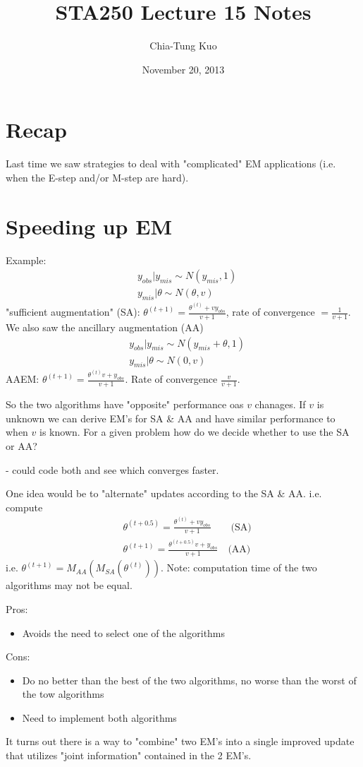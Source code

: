 \documentclass[11pt,letterpaper]{article}
\title{STA250 Lecture 15 Notes}
\author{Chia-Tung Kuo}
\date{November 20, 2013}
\begin{document}
\maketitle

\section*{Recap}
Last time we saw strategies to deal with "complicated" EM applications (i.e. when the E-step and/or M-step are hard).

\section*{Speeding up EM}
Example: 
\begin{align*}
&y_{obs} | y_{mis} \sim N(y_{mis}, 1)\\
& y_{mis}|\theta \sim N(\theta, v)
\end{align*}
"sufficient augmentation" (SA): $\theta^{(t+1)} = \frac{\theta^{(t)} + v y_{obs}}{v+1}$, rate of convergence $= \frac{1}{v+1}$.
We also saw the ancillary augmentation (AA)
\begin{align*}
&y_{obs} | y_{mis} \sim N(y_{mis}+\theta, 1)\\
& y_{mis}|\theta \sim N(0, v)
\end{align*}
AAEM: $\theta^{(t+1)} = \frac{\theta^{(t)}v +  y_{obs}}{v+1}$. Rate of convergence $\frac{v}{v+1}$.

So the two algorithms have "opposite" performance oas $v$ chanages. If $v$ is unknown we can derive EM's for SA \& AA and have similar performance to when $v$ is known.
For a given problem how do we decide whether to use the SA or AA?

 - could code both and see which converges faster.
 
One idea would be to "alternate" updates according to the SA \& AA. i.e. compute
\begin{align*}
&\theta^{(t+0.5)} = \frac{\theta^{(t)} + v y_{obs}}{v+1} \mbox{~~~~~~(SA)}\\
&\theta^{(t+1)} = \frac{\theta^{(t+0.5)}v +  y_{obs}}{v+1} \mbox{~~~(AA)}
\end{align*}
i.e. $\theta^{(t+1)} = M_{AA}(M_{SA}(\theta^{(t)}))$.
Note: computation time of the two algorithms may not be equal.

Pros:
\begin{itemize}
\item Avoids the need to select one of the algorithms
\end{itemize}
Cons:
\begin{itemize}
\item Do no better than the best of the two algorithms, no worse than the worst of the tow algorithms
\item Need to implement both algorithms
\end{itemize}
It turns out there is a way to "combine" two EM's into a single improved update that utilizes "joint information" contained in the 2 EM's.
\end{document}

